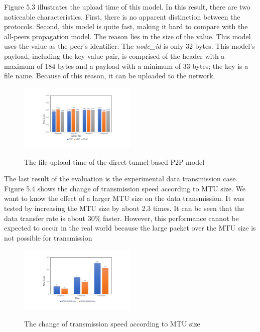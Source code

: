 Figure 5.3 illustrates the upload time of this model. In this result, there are two noticeable characteristics. First, there is no apparent distinction between the protocols. Second, this model is quite fast, making it hard to compare with the all-peers propagation model. The reason lies in the size of the value. This model uses the value as the peer's identifier. The \textit{node\_id} is only 32 bytes. This model’s payload, including the key-value pair, is comprised of the header with a maximum of 184 bytes and a payload with a minimum of 33 bytes; the key is a file name. Because of this reason, it can be uploaded to the network.

\begin{figure}[!ht]
	\centering
	\includegraphics[width=0.5\textwidth]{images/fig_5_3.pdf}\\
	\caption{The file upload time of the direct tunnel-based P2P model}
	\label{fig:t_upload}
\end{figure}

The last result of the evaluation is the experimental data transmission case. Figure 5.4 shows the change of transmission speed according to MTU size. We want to know the effect of a larger MTU size on the data transmission. It was tested by increasing the MTU size by about 2.3 times. It can be seen that the data transfer rate is about 30\% faster. However, this performance cannot be expected to occur in the real world because the large packet over the MTU size is not possible for transmission

\begin{figure}[!ht]
	\centering
	\includegraphics[width=0.5\textwidth]{images/fig_5_4.pdf}\\
	\caption{The change of transmission speed according to MTU size}
	\label{fig:MTU size}
\end{figure}

